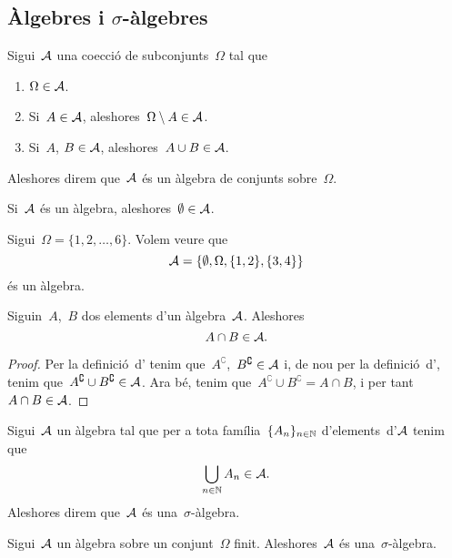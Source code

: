 \documentclass[../Apunts.tex]{subfiles}
\begin{document}
\subsection{Àlgebres i \(\sigma\)-àlgebres}
	\begin{definition}[Àlgebra]
		\label{def:àlgebra}
		Sigui~\(\mathcal{A}\) una co{\lgem}ecció de subconjunts~\(\Omega\) tal que
		\begin{enumerate}
			\item \(\Omega\in\mathcal{A}\).
			\item Si~\(A\in\mathcal{A}\), aleshores~\(\Omega\setminus A\in\mathcal{A}\).
			\item Si~\(A\), \(B\in\mathcal{A}\), aleshores~\(A\cup B\in\mathcal{A}\).
		\end{enumerate}
		Aleshores direm que~\(\mathcal{A}\) és un àlgebra de conjunts sobre~\(\Omega\).
	\end{definition}
	\begin{observation}
		\label{obs:el conjunt buit pertany a qualsevol àlgebra}
		Si~\(\mathcal{A}\) és un àlgebra, aleshores~\(\emptyset\in\mathcal{A}\).
	\end{observation}
	\begin{example}
		\label{ex:exemple d'àlgebra}
		Sigui~\(\Omega=\{1,2,\dots,6\}\). Volem veure que
		\[\mathcal{A}=\{\emptyset,\Omega,\{1,2\},\{3,4\}\}\]
		és un àlgebra.
		\begin{solution}
		\end{solution}
	\end{example}
	\begin{proposition}
		\label{prop:les àlgebras són tancades per interseccions}
		Siguin~\(A\),~\(B\) dos elements d'un àlgebra~\(\mathcal{A}\). Aleshores
		\[A\cap B\in\mathcal{A}.\]
		\begin{proof}
			Per la definició~d' tenim que~\(A^{\complement}\),~\(B^{\complement}\in\mathcal{A}\) i, de nou per la definició~d', tenim que~\(A^{\complement}\cup B^{\complement}\in\mathcal{A}\). Ara bé,%
			tenim que~\(A^{\complement}\cup B^{\complement}=A\cap B\), i per tant~\(A\cap B\in\mathcal{A}\).
		\end{proof}
	\end{proposition}
	\begin{definition}
		\label{def:sigma àlgebra}
		Sigui~\(\mathcal{A}\) un àlgebra tal que per a tota família~\(\{A_{n}\}_{n\in\mathbb{N}}\) d'elements~d'\(\mathcal{A}\) tenim que
		\[\bigcup_{n\in\mathbb{N}}A_{n}\in\mathcal{A}.\]
		Aleshores direm que~\(\mathcal{A}\) és una~\(\sigma\)-àlgebra.
	\end{definition}
	\begin{observation}
		Sigui~\(\mathcal{A}\) un àlgebra sobre un conjunt~\(\Omega\) finit. Aleshores~\(\mathcal{A}\) és una~\(\sigma\)-àlgebra.
	\end{observation}
\end{document}
